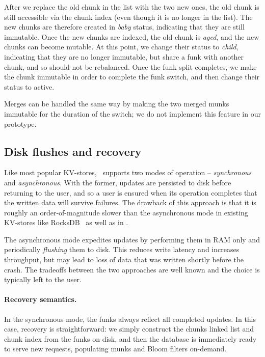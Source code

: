 After we replace the old chunk in the list with the two new ones, 
the old chunk is still accessible via the chunk index (even though it is no longer in the list). 
The new chunks are therefore created in \emph{baby} status, indicating that they are still immutable. 
Once the new chunks are indexed, the old chunk is \emph{aged}, and the new chunks can become mutable.
At this point, we change their status to \emph{child}, indicating that they are no longer immutable, but share a funk with another chunk,
and so should not be rebalanced. Once the funk split completes, we make the chunk immutable in order
to complete the funk switch, and then change their  status  to active. 

Merges can be handled the same way by making the two merged munks immutable for the duration of the switch; we do not implement this feature in our prototype.

\subsection{Disk flushes and recovery}
\label{ssec:flush-recovery}

Like most popular KV-stores, \sys\ supports two modes of operation -- \emph{synchronous} and \emph{asynchronous}. 
With the former,  updates are persisted to disk before returning to the user, and so a user is ensured when its operation
completes that the written data will survive failures. The drawback of this approach is that it is 
roughly an order-of-magnitude slower than the asynchronous mode in  existing KV-stores like RocksDB~\cite{RocksDB} as well as in \sys. 

The asynchronous mode expedites updates by performing them in
RAM only and periodically \emph{flushing} them to disk. This reduces write latency and increases throughput, but 
may lead to loss of data that was written shortly before the crash. The tradeoffs between the two approaches are 
well known and the choice is typically left to the user.

\paragraph{Recovery semantics.}
In the synchronous mode, 
the funks always reflect all completed updates. In this case, recovery is straightforward: we simply construct
the chunks linked list and chunk index from the funks on disk, and then the database is immediately ready to serve new requests, populating munks and Bloom filters on-demand.  

